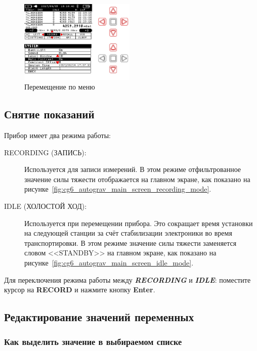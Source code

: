 \begin{figure}[h]
  \centering
  \includegraphics[width=0.49\textwidth]{figures/navigation_the_menus}
  \caption{Перемещение по меню}
  \label{fig:navigation_the_menus}
\end{figure}

\subsection{Снятие показаний}

Прибор имеет два режима работы:
\begin{description}
  \item[RECORDING (ЗАПИСЬ):] Используется для записи измерений. В этом режиме
    отфильтрованное значение силы тяжести отображается на главном экране, как
    показано на рисунке~\ref{fig:cg6_autograv_main_screen_recording_mode}.

  \item[IDLE (ХОЛОСТОЙ ХОД):] Используется при перемещении прибора. Это
    сокращает время установки на следующей станции за счёт стабилизации
    электроники во время транспортировки. В этом режиме значение силы тяжести
    заменяется словом <<STANDBY>> на главном экране, как показано на
    рисунке~\ref{fig:cg6_autograv_main_screen_idle_mode}. 
\end{description}

Для переключения режима работы между \textit{\textbf{RECORDING}} и
\textit{\textbf{IDLE}}: поместите курсор на \textbf{RECORD} и
нажмите кнопку \textbf{Enter}.

\subsection{Редактирование значений переменных}

\subsubsection{Как выделить значение в выбираемом списке}

